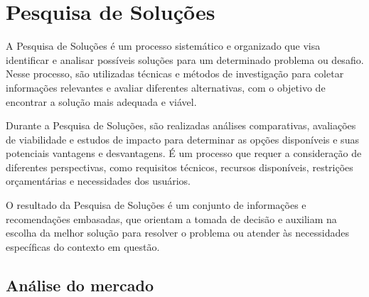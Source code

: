 \documentclass[
	12pt,				%
	openright,			%
	twoside,			%
	a4paper,			%
	english,			%
	brazil				%
	]{abntex2}
\begin{document}
\chapter{Pesquisa de Soluções}\label{pesq_soluc}

A Pesquisa de Soluções é um processo sistemático e organizado que visa identificar e analisar possíveis soluções para um determinado problema ou desafio. Nesse processo, são utilizadas técnicas e métodos de investigação para coletar informações relevantes e avaliar diferentes alternativas, com o objetivo de encontrar a solução mais adequada e viável.

Durante a Pesquisa de Soluções, são realizadas análises comparativas, avaliações de viabilidade e estudos de impacto para determinar as opções disponíveis e suas potenciais vantagens e desvantagens. É um processo que requer a consideração de diferentes perspectivas, como requisitos técnicos, recursos disponíveis, restrições orçamentárias e necessidades dos usuários.

O resultado da Pesquisa de Soluções é um conjunto de informações e recomendações embasadas, que orientam a tomada de decisão e auxiliam na escolha da melhor solução para resolver o problema ou atender às necessidades específicas do contexto em questão.

\section{Análise do mercado}\label{pesq_merc}
\end{document}
